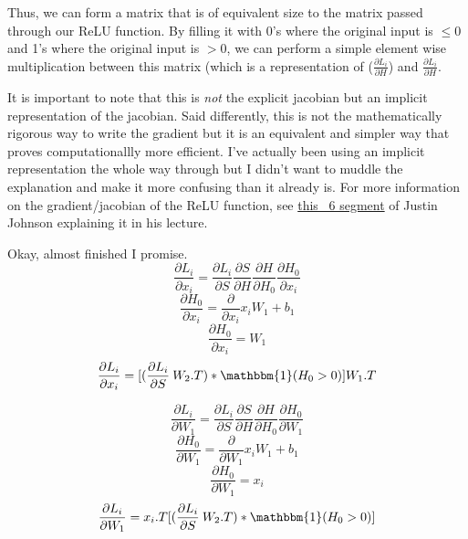 \documentclass[12pt]{article}
\begin{document}
Thus, we can form a matrix that is of equivalent size to the matrix passed through our ReLU function. By 
filling it with 0's where the original input is $ \le 0$ and 1's where the original input is $ > 0$, we 
can perform a simple element wise multiplication between this matrix (which is a representation of 
($\frac{\partial L_i}{\partial H}$) and $\frac{\partial L_i}{\partial H}$. 

It is important to note that 
this is \emph{not} the explicit jacobian but an implicit representation of the jacobian. Said differently, 
this is not the mathematically rigorous way to write the gradient but it is an equivalent and simpler 
way that proves computationallly more efficient. I've actually been using an implicit representation the 
whole way through but I didn't want to muddle the explanation and make it more confusing than it already is. 
For more information on the gradient/jacobian of the ReLU function, see \href{https://www.youtube.com/watch?v=PBe2P05ljPw}{this
~6 segment} of Justin Johnson explaining it in his lecture. 

Okay, almost finished I promise. 
\begin{equation}
    \frac{\partial L_i}{\partial x_i} = \frac{\partial L_i}{\partial S} \frac{\partial S}{\partial H}
    \frac{\partial H}{\partial H_0} \frac{\partial H_0}{\partial x_i} 
\end{equation}
\begin{equation}
    \frac{\partial H_0}{\partial x_i} = \frac{\partial}{\partial x_i} x_i W_1 + b_1
\end{equation}
\begin{equation}
    \frac{\partial H_0}{\partial x_i} = W_1
\end{equation}
\begin{equation}
    \frac{\partial L_i}{\partial x_i} = [ (\frac{\partial L_i}{\partial S}\: W_2.T) * 
    \mathbbm{1}(H_0 > 0) ] W_1.T
\end{equation}

\begin{equation}
    \frac{\partial L_i}{\partial W_1} = \frac{\partial L_i}{\partial S} \frac{\partial S}{\partial H}
    \frac{\partial H}{\partial H_0} \frac{\partial H_0}{\partial W_1} 
\end{equation}
\begin{equation}
    \frac{\partial H_0}{\partial W_1} = \frac{\partial}{\partial W_1} x_i W_1 + b_1
\end{equation}
\begin{equation}
    \frac{\partial H_0}{\partial W_1} = x_i
\end{equation}
\begin{equation}
    \frac{\partial L_i}{\partial W_1} = x_i.T [ (\frac{\partial L_i}{\partial S}\: W_2.T) * 
    \mathbbm{1}(H_0 > 0) ]
\end{equation}
\end{document}
